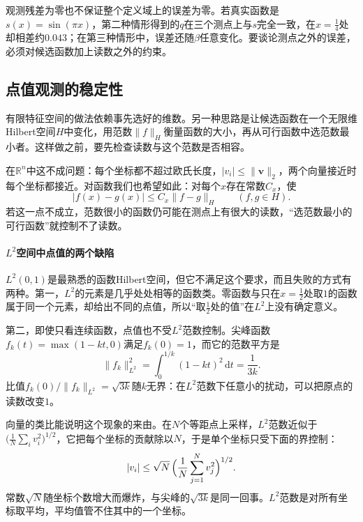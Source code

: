 观测残差为零也不保证整个定义域上的误差为零。若真实函数是$s(x)=\sin(\pi x)$，第二种情形得到的$q$在三个测点上与$s$完全一致，在$x=\tfrac14$处却相差约$0.043$；在第三种情形中，误差还随$\beta$任意变化。要谈论测点之外的误差，必须对候选函数加上读数之外的约束。

\subsection{点值观测的稳定性}
\label{sec:rkhs-point-stability}

有限特征空间的做法依赖事先选好的维数。另一种思路是让候选函数在一个无限维Hilbert空间$H$中变化，用范数$\lVert f\rVert_H$衡量函数的大小，再从可行函数中选范数最小者。这样做之前，要先检查读数与这个范数是否相容。

在$\mathbb R^n$中这不成问题：每个坐标都不超过欧氏长度，$\lvert v_i\rvert\leq\lVert\bm v\rVert_2$，两个向量接近时每个坐标都接近。对函数我们也希望如此：对每个$x$存在常数$C_x$，使
\begin{equation}
\lvert f(x)-g(x)\rvert\leq C_x\lVert f-g\rVert_H\qquad(f,g\in H).
\label{eq:rkhs-stability-requirement}
\end{equation}
若这一点不成立，范数很小的函数仍可能在测点上有很大的读数，“选范数最小的可行函数”就控制不了读数。

\paragraph{$L^2$空间中点值的两个缺陷}

$L^2(0,1)$是最熟悉的函数Hilbert空间，但它不满足这个要求，而且失败的方式有两种。第一，$L^2$的元素是几乎处处相等的函数类。零函数与只在$x=\tfrac12$处取$1$的函数属于同一个元素，却给出不同的点值，所以“取$\tfrac12$处的值”在$L^2$上没有确定意义。

第二，即使只看连续函数，点值也不受$L^2$范数控制。尖峰函数$f_k(t)=\max(1-kt,0)$满足$f_k(0)=1$，而它的范数平方是
\[
\lVert f_k\rVert_{L^2}^2=\int_0^{1/k}(1-kt)^2\,\mathrm dt=\frac{1}{3k}.
\]
比值$f_k(0)/\lVert f_k\rVert_{L^2}=\sqrt{3k}$随$k$无界：在$L^2$范数下任意小的扰动，可以把原点的读数改变$1$。

向量的类比能说明这个现象的来由。在$N$个等距点上采样，$L^2$范数近似于$\bigl(\tfrac1N\sum_iv_i^2\bigr)^{1/2}$，它把每个坐标的贡献除以$N$，于是单个坐标只受下面的界控制：
\[
\lvert v_i\rvert\leq\sqrt N\,\Bigl(\frac1N\sum_{j=1}^Nv_j^2\Bigr)^{1/2}.
\]
常数$\sqrt N$随坐标个数增大而爆炸，与尖峰的$\sqrt{3k}$是同一回事。$L^2$范数是对所有坐标取平均，平均值管不住其中的一个坐标。


